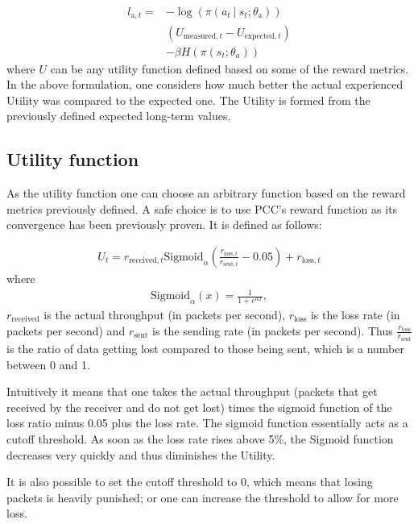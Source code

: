 \documentclass[sigconf]{acmart}
\newcommand\givenbase[1][]{\:#1\lvert\:}
\let\given\givenbase
\begin{document}
\begin{align*}
l_{\text{a},t} =& -\log \left( \pi \left( a_t \given s_t ; \theta_\text{a} \right) \right)\\
& \left( U_{\text{measured},t} - U_{\text{expected},t} \right)\\ 
&- \beta H\left( \pi\left( s_t; \theta_a \right)\right)
\end{align*}
where $U$ can be any utility function defined based on some of the reward metrics. In the above formulation, one considers how much better the actual experienced Utility was compared to the expected one. The Utility is formed from the previously defined expected long-term values. 
 
\subsection{Utility function}

As the utility function one can choose an arbitrary function based on the reward metrics previously defined. A safe choice is to use PCC's \citep{dong_pcc:_2015} reward function as its convergence has been previously proven. It is defined as follows:

\begin{align*}
U_t = r_{\text{received},t}\text{Sigmoid}_\alpha\left(\frac{r_{\text{loss},t}}{r_{\text{sent},t}} - 0.05\right) + r_{\text{loss},t}
\end{align*}
where 
\begin{align*}
\text{Sigmoid}_\alpha(x) = \frac{1}{1+e^{\alpha x}},
\end{align*}
$r_\text{received}$ is the actual throughput (in packets per second), $r_\text{loss}$ is the loss rate (in packets per second) and $r_\text{sent}$ is the sending rate (in packets per second). Thus $\frac{r_\text{loss}}{r_\text{sent}}$ is the ratio of data getting lost compared to those being sent, which is a number between 0 and 1.

Intuitively it means that one takes the actual throughput (packets that get received by the receiver and do not get lost) times the sigmoid function of the loss ratio minus 0.05 plus the loss rate. The sigmoid function essentially acts as a cutoff threshold. As soon as the loss rate rises above 5\%, the Sigmoid function decreases very quickly and thus diminishes the Utility. 

It is also possible to set the cutoff threshold to 0, which means that losing packets is heavily punished; or one can increase the threshold to allow for more loss. 
\end{document}
